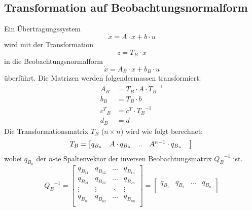 \subsection{Transformation auf Beobachtungsnormalform}
Ein Übertragungssystem 
\[ \dot{x}=A\cdot x +  b \cdot u \]
wird mit der Transformation  
\[ z=T_B\cdot x \]
in die Beobachtungsnormalform
\[ \dot{x}=A_B\cdot x +  b_B \cdot u \]
überführt. Die Matrizen werden folgendermassen transformiert:
\[\begin{aligned}
	A_B &= T_B\cdot A \cdot {T_B}^{-1}	\\	
	b_B &= T_B\cdot b	\\	
	{c^T}_B &= c^T\cdot {T_B}^{-1}	\\	
	d_B &= d
\end{aligned}\]
Die Transformationsmatrix $T_B$ ($n\times n$) wird wie folgt berechnet:
\[
	T_B=
	\begin{bmatrix}
		q_{B_n} & A\cdot q_{B_n} &  ..& A^{n-1}\cdot q_{B_n} & \\
	\end{bmatrix}	\\
\]
wobei $q_{B_n}$ der $n$-te Spaltenvektor der inversen Beobachtungsmatrix ${Q_B}^{-1}$ ist.
\[
	{Q_B}^{-1} = \begin{bmatrix}
	 q_{B_{11}} & q_{B_{12}} & \ldots & q_{B_{1n}}\\
	 q_{B_{21}} & q_{B_{22}} & \ldots & q_{B_{2n}}\\
	 \vdots		& \vdots	 & \ddots & \vdots\\
	 q_{B_{n1}} & q_{B_{n2}} & \ldots & q_{B_{nn}}\\	 
	\end{bmatrix} =
	\begin{bmatrix}
		q_{B_1} & q_{B_2} & \ldots & q_{B_n} \\
	\end{bmatrix}	
\]


